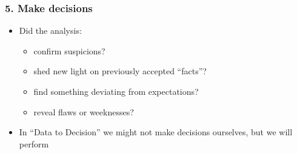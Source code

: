 \documentclass[letterpaper,10pt,english]{jupyterBook}
\begin{document}
\subsubsection{5. Make decisions}
\label{\detokenize{1_Decision_making/Decision_making:make-decisions}}\begin{itemize}
\item {} 
\sphinxAtStartPar
Did the analysis:
\begin{itemize}
\item {} 
\sphinxAtStartPar
confirm suspicions?

\item {} 
\sphinxAtStartPar
shed new light on previously accepted “facts”?

\item {} 
\sphinxAtStartPar
find something deviating from expectations?

\item {} 
\sphinxAtStartPar
reveal flaws or weeknesses?

\end{itemize}

\item {} 
\sphinxAtStartPar
In “Data to Decision” we might not make decisions ourselves, but we will perform 

\end{itemize}
\end{document}
